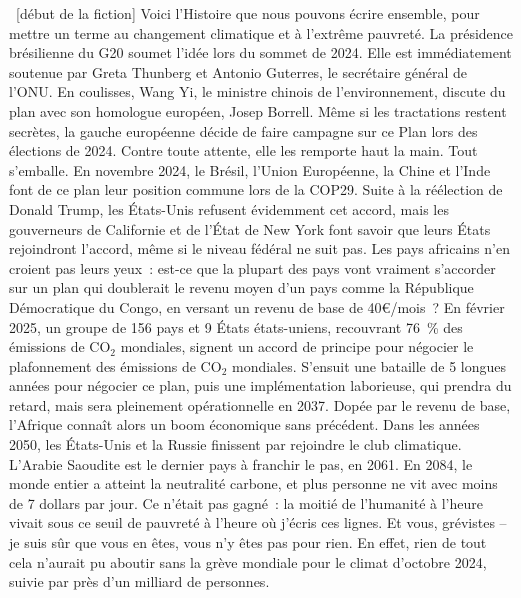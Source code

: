 \documentclass[a5paper,french]{memoir}
\begin{document}
~[début de la fiction] Voici l'Histoire que nous pouvons écrire ensemble, pour mettre un terme au changement climatique et à l'extrême pauvreté. La présidence brésilienne du G20 soumet l'idée lors du sommet de 2024. Elle est immédiatement soutenue par Greta Thunberg et Antonio Guterres, le secrétaire général de l'ONU. 
En coulisses, Wang Yi, le ministre chinois de l'environnement, discute du plan avec son homologue européen, Josep Borrell. 
Même si les tractations restent secrètes, la gauche européenne décide de faire campagne sur ce Plan lors des élections de 2024. Contre toute attente, elle les remporte haut la main. Tout s'emballe. En novembre 2024, le Brésil, l'Union Européenne, la Chine et l'Inde font de ce plan leur position commune lors de la COP29. Suite à la réélection de Donald Trump, les États-Unis refusent évidemment cet accord, mais les gouverneurs de Californie et de l'État de New York font savoir que leurs États rejoindront l'accord, même si le niveau fédéral ne suit pas. Les pays africains n'en croient pas leurs yeux~: est-ce que la plupart des pays vont vraiment s'accorder sur un plan qui doublerait le revenu moyen d'un pays comme la République Démocratique du Congo, en versant un revenu de base de 40\euro{}/mois~? En février 2025, un groupe de 156 pays et 9 États états-uniens, recouvrant 76~\% des émissions de CO$_\text{2}$ mondiales, signent un accord de principe pour négocier le plafonnement des émissions de CO$_\text{2}$ mondiales. S'ensuit une bataille de 5 longues années pour négocier ce plan, puis une implémentation laborieuse, qui prendra du retard, mais sera pleinement opérationnelle en 2037. Dopée par le revenu de base, l'Afrique connaît alors un boom économique sans précédent. Dans les années 2050, les États-Unis et la Russie finissent par rejoindre le club climatique. L'Arabie Saoudite est le dernier pays à franchir le pas, en 2061. En 2084, le monde entier a atteint la neutralité carbone, et plus personne ne vit avec moins de 7 dollars par jour. Ce n'était pas gagné~: la moitié de l'humanité à l'heure vivait sous ce seuil de pauvreté à l'heure où j'écris ces lignes. Et vous, grévistes -- je suis sûr que vous en êtes, vous n'y êtes pas pour rien. En effet, rien de tout cela n'aurait pu aboutir sans la grève mondiale pour le climat d'octobre 2024, suivie par près d'un milliard de personnes.
\end{document}

